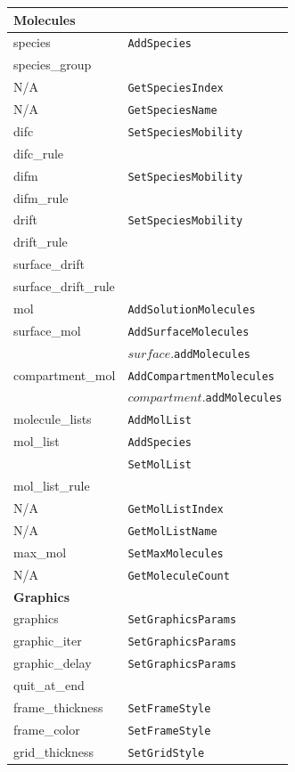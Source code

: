 \documentclass {scrbook}
\newcommand {\ttt} {\texttt}
\begin{document}
\begin{longtable}[c]{ll}
\hline
\multicolumn{2}{l}{\hspace{0.3in}\textbf{Molecules}}\\
\hline
species & \ttt{AddSpecies}\\
species\_group\\ %
N/A & \ttt{GetSpeciesIndex}\\
N/A & \ttt{GetSpeciesName}\\
difc & \ttt{SetSpeciesMobility}\\
difc\_rule \\ %
difm & \ttt{SetSpeciesMobility}\\
difm\_rule & \\ %
drift & \ttt{SetSpeciesMobility}\\
drift\_rule \\ %
surface\_drift \\ %
surface\_drift\_rule \\ %
mol & \ttt{AddSolutionMolecules}\\
surface\_mol & \ttt{AddSurfaceMolecules}\\
 & $surface$.\ttt{addMolecules}\\
compartment\_mol & \ttt{AddCompartmentMolecules}\\
 & $compartment$.\ttt{addMolecules}\\
molecule\_lists & \ttt{AddMolList}\\
mol\_list & \ttt{AddSpecies}\\
& \ttt{SetMolList}\\
mol\_list\_rule \\ %
N/A & \ttt{GetMolListIndex}\\
N/A & \ttt{GetMolListName}\\
max\_mol & \ttt{SetMaxMolecules}\\
N/A & \ttt{GetMoleculeCount}\\
\hline
\multicolumn{2}{l}{\hspace{0.3in}\textbf{Graphics}}\\
\hline
graphics & \ttt{SetGraphicsParams}\\
graphic\_iter & \ttt{SetGraphicsParams}\\
graphic\_delay & \ttt{SetGraphicsParams}\\
quit\_at\_end \\ %
frame\_thickness & \ttt{SetFrameStyle}\\
frame\_color & \ttt{SetFrameStyle}\\
grid\_thickness & \ttt{SetGridStyle}\\

\end{longtable}
\end{document}
